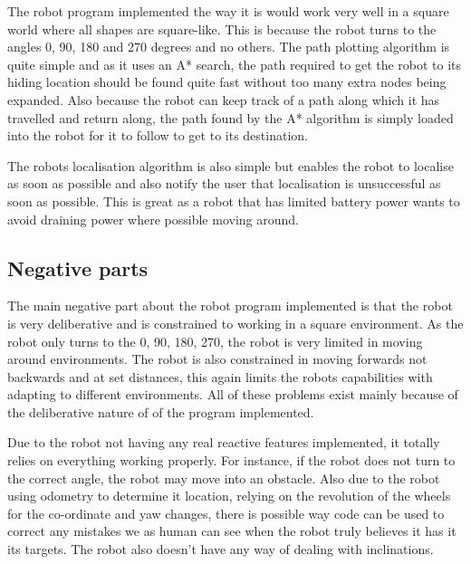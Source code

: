 \documentclass[a4paper,12pt]{article}
\begin{document}
\vspace{5mm}
\noindent The robot program implemented the way it is would work very well in a square world where all shapes are square-like. This is because the robot turns to the angles 0, 90, 180 and 270 degrees and no others. The path plotting algorithm is quite simple and as it uses an A* search, the path required to get the robot to its hiding location should be found quite fast without too many extra nodes being expanded. Also because the robot can keep track of a path along which it has travelled and return along, the path found by the A* algorithm is simply loaded into the robot for it to follow to get to its destination.

\vspace{5mm}
\noindent The robots localisation algorithm is also simple but enables the robot to localise as soon as possible and also notify the user that localisation is unsuccessful as soon as possible. This is great as a robot that has limited battery power wants to avoid draining power where possible moving around.

\subsection{Negative parts}
\noindent The main negative part about the robot program implemented is that the robot is very deliberative and is constrained to working in a square environment. As the robot only turns to the 0, 90, 180, 270, the robot is very limited in moving around environments. The robot is also constrained in moving forwards not backwards and at set distances, this again limits the robots capabilities with adapting to different environments. All of these problems exist mainly because of the deliberative nature of of the program implemented.

\vspace{5mm}
\noindent Due to the robot not having any real reactive features implemented, it totally relies on everything working properly. For instance, if the robot does not turn to the correct angle, the robot may move into an obstacle. Also due to the robot using odometry to determine it location, relying on the revolution of the wheels for the co-ordinate and yaw changes, there is possible way code can be used to correct any mistakes we as human can see when the robot truly believes it has it its targets. The robot also doesn't have any way of dealing with inclinations.
\end{document}
